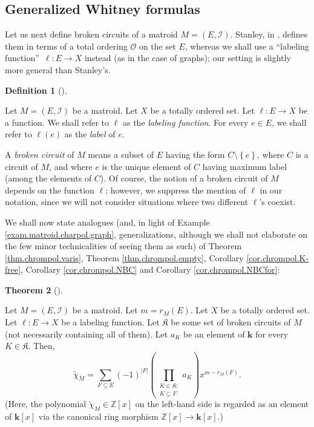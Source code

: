 \documentclass[numbers=enddot,12pt,final,onecolumn,notitlepage]{scrartcl}%
\theoremstyle{definition}
\newtheorem{theo}{Theorem}[section]
\newenvironment{theorem}[1][]
{\begin{theo}[#1]\begin{leftbar}}
{\end{leftbar}\end{theo}}
\newtheorem{defi}[theo]{Definition}
\newenvironment{definition}[1][]
{\begin{defi}[#1]\begin{leftbar}}
{\end{leftbar}\end{defi}}
\let\sumnonlimits\sum
\let\prodnonlimits\prod
\renewcommand{\sum}{\sumnonlimits\limits}
\renewcommand{\prod}{\prodnonlimits\limits}
\begin{document}
\subsection{Generalized Whitney formulas}

Let us next define broken circuits of a matroid $M=\left(  E,\mathcal{I}%
\right)  $. Stanley, in \cite[\S 4.1]{Stanley}, defines them in terms of a
total ordering $\mathcal{O}$ on the set $E$, whereas we shall use a
\textquotedblleft labeling function\textquotedblright\ $\ell:E\rightarrow X$
instead (as in the case of graphs); our setting is slightly more general than Stanley's.

\begin{definition}
\label{def.matroid.BC}Let $M=\left(  E,\mathcal{I}\right)  $ be a matroid. Let
$X$ be a totally ordered set. Let $\ell:E\rightarrow X$ be a function. We
shall refer to $\ell$ as the \emph{labeling function}. For every $e\in E$, we
shall refer to $\ell\left(  e\right)  $ as the \emph{label} of $e$.

A \emph{broken circuit} of $M$ means a subset of $E$ having the form
$C\setminus\left\{  e\right\}  $, where $C$ is a circuit of $M$, and where $e$
is the unique element of $C$ having maximum label (among the elements of $C$).
Of course, the notion of a broken circuit of $M$ depends on the function
$\ell$; however, we suppress the mention of $\ell$ in our notation, since we
will not consider situations where two different $\ell$'s coexist.
\end{definition}

We shall now state analogues (and, in light of Example
\ref{exam.matroid.charpol.graph}, generalizations, although we shall not
elaborate on the few minor technicalities of seeing them as such) of Theorem
\ref{thm.chrompol.varis}, Theorem \ref{thm.chrompol.empty}, Corollary
\ref{cor.chrompol.K-free}, Corollary \ref{cor.chrompol.NBC} and Corollary
\ref{cor.chrompol.NBCfor}:


\begin{theorem}
\label{thm.matroid.charpol.varis}Let $M=\left(  E,\mathcal{I}\right)  $ be a
matroid. Let $m=r_{M}\left(  E\right)  $. Let $X$ be a totally ordered set.
Let $\ell:E\rightarrow X$ be a labeling function. Let $\mathfrak{K}$ be some
set of broken circuits of $M$ (not necessarily containing all of them). Let
$a_{K}$ be an element of $\mathbf{k}$ for every $K\in\mathfrak{K}$. Then,%
\[
\widetilde{\chi}_{M}=\sum_{F\subseteq E}\left(  -1\right)  ^{\left\vert
F\right\vert }\left(  \prod_{\substack{K\in\mathfrak{K};\\K\subseteq F}%
}a_{K}\right)  x^{m-r_{M}\left(  F\right)  }.
\]
(Here, the polynomial $\widetilde{\chi}_{M}
\in\mathbb{Z}\left[  x\right]  $ on the left-hand side is regarded as an
element of $\mathbf{k}\left[  x\right]  $ via the canonical ring morphism
$\mathbb{Z}\left[  x\right]  \rightarrow\mathbf{k}\left[  x\right]  $.)
\end{theorem}
\end{document}
